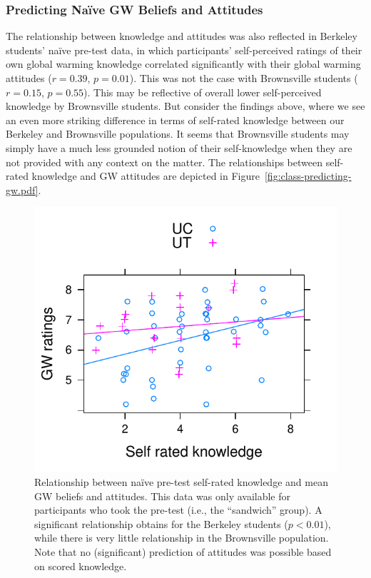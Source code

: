 \subsubsection{Predicting Na\"ive GW Beliefs and Attitudes}

The relationship between knowledge and attitudes was also reflected in Berkeley
students’ naïve pre-test data, in which participants’ self-perceived ratings of
their own global warming knowledge correlated significantly with their global
warming attitudes ($r = 0.39$, $p = 0.01$). This was not the case with
Brownsville students ($r = 0.15$, $p = 0.55$). This may be reflective of overall
lower self-perceived knowledge by Brownsville students. But consider the
findings above, where we see an even more striking difference in terms of
self-rated knowledge between our Berkeley and Brownsville populations. It seems
that Brownsville students may simply have a much less grounded notion of their
self-knowledge when they are not provided with any context on the matter. The
relationships between self-rated knowledge and GW attitudes are depicted in
Figure~\ref{fig:class-predicting-gw.pdf}.

\begin{figure}
    \centering
    \includegraphics{class-predicting-gw.pdf}
    \caption{Relationship between na\"ive pre-test self-rated knowledge and mean GW
        beliefs and attitudes. This data was only available for participants who
    took the pre-test (i.e., the “sandwich” group). A significant relationship
    obtains for the Berkeley students ($p < 0.01$), while there is very little
    relationship in the Brownsville population. Note that no (significant)
    prediction of attitudes was possible based on scored knowledge.}
    \label{fig:class-predicting-gw}
\end{figure}

